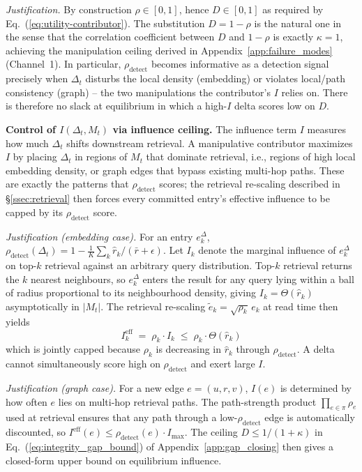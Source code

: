 \textit{Justification.}
By construction $\rho \in [0,1]$, hence $D \in [0,1]$ as required by
Eq.~(\ref{eq:utility-contributor}). The substitution $D = 1-\rho$
is the natural one in the sense that the correlation coefficient
between $D$ and $1-\rho$ is exactly $\kappa = 1$, achieving the
manipulation ceiling derived in Appendix~\ref{app:failure_modes}
(Channel~1). In particular, $\rho_{\text{detect}}$ becomes informative
as a detection signal precisely when $\Delta_t$ disturbs the local
density (embedding) or violates local/path consistency (graph) -- the
two manipulations the contributor's $I$ relies on. There is therefore
no slack at equilibrium in which a high-$I$ delta scores low on
$D$.

\textbf{Control of $I(\Delta_t,M_t)$ via influence ceiling.}
The influence term $I$ measures how much $\Delta_t$ shifts downstream
retrieval. A manipulative contributor maximizes $I$ by placing
$\Delta_t$ in regions of $M_t$ that dominate retrieval, i.e., regions of
high local embedding density, or graph edges that bypass existing
multi-hop paths. These are exactly the patterns that
$\rho_{\text{detect}}$ scores; the retrieval re-scaling described in
\S\ref{ssec:retrieval} then forces every committed entry's effective
influence to be capped by its $\rho_{\text{detect}}$ score.

\textit{Justification (embedding case).}
For an entry $e_k^\Delta$,
$\rho_{\text{detect}}(\Delta_t) = 1 - \frac{1}{K}\sum_k \hat r_k/(\bar r+\epsilon)$.
Let $I_k$ denote the marginal influence of $e_k^\Delta$ on top-$k$
retrieval against an arbitrary query distribution. Top-$k$ retrieval
returns the $k$ nearest neighbours, so $e_k^\Delta$ enters the result
for any query lying within a ball of radius proportional to its
neighbourhood density, giving $I_k = \Theta(\hat r_k)$ asymptotically
in $|M_t|$. The retrieval re-scaling
$\tilde e_k = \sqrt{\rho_k}\,e_k$ at read time then yields
\[
I_k^{\text{eff}} \;=\; \rho_k \cdot I_k \;\leq\; \rho_k \cdot \Theta(\hat r_k)
\]
which is jointly capped because $\rho_k$ is decreasing in $\hat r_k$
through $\rho_{\text{detect}}$. A delta cannot simultaneously score
high on $\rho_{\text{detect}}$ and exert large $I$.

\textit{Justification (graph case).}
For a new edge $e=(u,r,v)$, $I(e)$ is determined by how often $e$ lies
on multi-hop retrieval paths. The path-strength product
$\prod_{e\in\pi}\rho_e$ used at retrieval ensures that any path through
a low-$\rho_{\text{detect}}$ edge is automatically discounted, so
$I^{\text{eff}}(e) \leq \rho_{\text{detect}}(e)\cdot I_{\max}$. The
ceiling $D \leq 1/(1+\kappa)$ in
Eq.~(\ref{eq:integrity_gap_bound}) of
Appendix~\ref{app:gap_closing} then gives a closed-form upper bound on
equilibrium influence.

